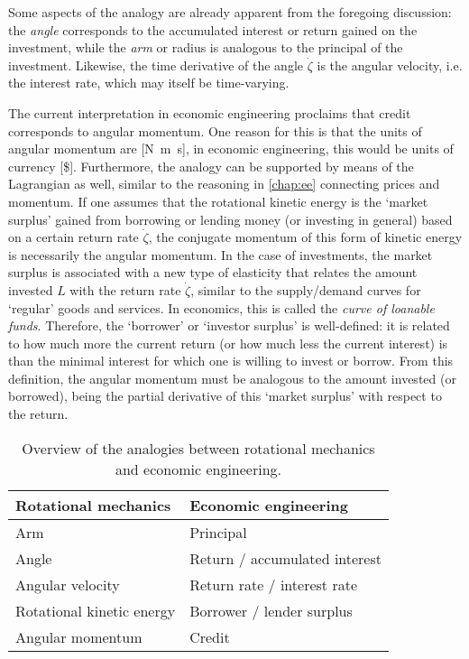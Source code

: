 Some aspects of the analogy are already apparent from the foregoing discussion: the \emph{angle} corresponds to the accumulated interest or return gained on the investment, while the \emph{arm} or radius is analogous to the principal of the investment. Likewise, the time derivative of the angle $\dot{\zeta}$ is the angular velocity, i.e. the interest rate, which may itself be time-varying.

The current interpretation in economic engineering proclaims that credit corresponds to angular momentum. One reason for this is that the units of angular momentum are [\si{\newton \meter \second}], in economic engineering, this would be units of currency [\$]. Furthermore, the analogy can be supported by means of the Lagrangian as well, similar to the reasoning in \cref{chap:ee} connecting prices and momentum. If one assumes that the rotational kinetic energy is the `market surplus' gained from borrowing or lending money (or investing in general) based on a certain return rate $\dot{\zeta}$, the conjugate momentum of this form of kinetic energy is necessarily the angular momentum. In the case of investments, the market surplus is associated with a new type of elasticity that relates the amount invested $L$ with the return rate $\dot{\zeta}$, similar to the supply/demand curves for `regular' goods and services. In economics, this is called the \emph{curve of loanable funds}. Therefore, the `borrower' or `investor surplus' is well-defined: it is related to how much more the current return (or how much less the current interest) is than the minimal interest for which one is willing to invest or borrow. From this definition, the angular momentum must be analogous to the amount invested (or borrowed), being the partial derivative of this `market surplus' with respect to the return. 
\begin{table}[h]
    \centering
    \caption{Overview of the analogies between rotational mechanics and economic engineering.}
    \begin{tabular}{ll}
        \toprule
         \textbf{Rotational mechanics} & \textbf{Economic engineering} \\
         \midrule
         Arm & Principal \\
         Angle & Return / accumulated interest \\
         Angular velocity & Return rate / interest rate \\
         Rotational kinetic energy & Borrower / lender surplus \\
         Angular momentum & Credit \\
         \bottomrule
    \end{tabular}
    \label{tab:my_label}
\end{table}

